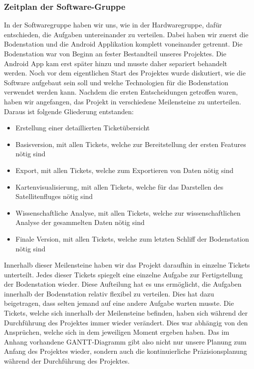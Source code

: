 \subsubsection{Zeitplan der Software-Gruppe}
In der Softwaregruppe haben wir uns, wie in der Hardwaregruppe, dafür entschieden, die Aufgaben untereinander zu verteilen. Dabei haben wir zuerst die Bodenstation und die Android Applikation komplett voneinander getrennt. Die Bodenstation war von Beginn an fester Bestandteil unseres Projektes. Die Android App kam erst später hinzu und musste daher separiert behandelt werden. Noch vor dem eigentlichen Start des Projektes wurde diskutiert, wie die Software aufgebaut sein soll und welche Technologien für die Bodenstation verwendet werden kann. Nachdem die ersten Entscheidungen getroffen waren, haben wir angefangen, das Projekt in verschiedene Meilensteine zu unterteilen. Daraus ist folgende Gliederung entstanden:
\begin{itemize}
    \item Erstellung einer detaillierten Ticketübersicht
    \item Basisversion, mit allen Tickets, welche zur Bereitstellung der ersten Features nötig sind
    \item Export, mit allen Tickets, welche zum Exportieren von Daten nötig sind
    \item Kartenvisualisierung, mit allen Tickets, welche für das Darstellen des Satellitenfluges nötig sind
    \item Wissenschaftliche Analyse, mit allen Tickets, welche zur wissenschaftlichen Analyse der gesammelten Daten nötig sind
    \item Finale Version, mit allen Tickets, welche zum letzten Schliff der Bodenstation nötig sind
\end{itemize}
Innerhalb dieser Meilensteine haben wir das Projekt daraufhin in einzelne Tickets unterteilt. Jedes dieser Tickets spiegelt eine einzelne Aufgabe zur Fertigstellung der Bodenstation wieder. Diese Aufteilung hat es uns ermöglicht, die Aufgaben innerhalb der Bodenstation relativ flexibel zu verteilen. Dies hat dazu beigetragen, dass selten jemand auf eine andere Aufgabe warten musste. Die Tickets, welche sich innerhalb der Meilensteine befinden, haben sich während der Durchführung des Projektes immer wieder verändert. Dies war abhängig von den Ansprüchen, welche sich in dem jeweiligen Moment ergeben haben. Das im Anhang vorhandene GANTT-Diagramm gibt also nicht nur unsere Planung zum Anfang des Projektes wieder, sondern auch die kontinuierliche Präzisionsplanung während der Durchführung des Projektes.

